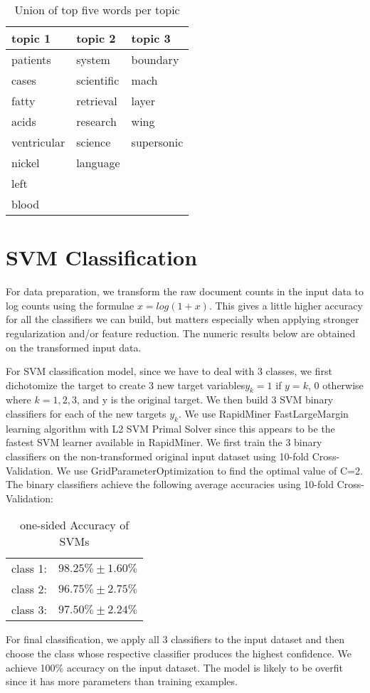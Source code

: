 \documentclass[fullpage]{article}
\begin{document}
\begin{table}[h]
\begin{center}
\begin{tabular}{| l | l | l |}
topic 1 & topic 2 & topic 3 \\
\hline
patients &system & boundary\\
cases &scientific &mach \\
fatty &retrieval &layer \\
acids &research & wing\\
ventricular &science &supersonic \\
nickel &language & \\
left & & \\
blood & & \\
\end{tabular}
\caption{Union of top five words per topic}
\end{center}
\end{table}


\section{SVM Classification}
For data preparation, we transform the raw document counts in the input data to log counts using the formulae $x=log(1+x)$. This gives a little higher accuracy for all the classifiers we can build, but matters especially when applying stronger regularization and/or feature reduction. The numeric results below are obtained on the transformed input data.

For SVM classification model, since we have to deal with 3 classes, we first dichotomize the target to create 3 new target variables$ y_{k}=1$ if $y=k$, 0 otherwise where $k=1,2,3$, and y is the original target. We then build 3 SVM binary classifiers for each of the new targets $y_{k}$. We use RapidMiner FastLargeMargin learning algorithm with L2 SVM Primal Solver since this appears to be the fastest SVM learner available in RapidMiner.
We first train the 3 binary classifiers on the non-transformed original input dataset using 10-fold Cross-Validation. We use GridParameterOptimization to find the optimal value of C=2. The binary classifiers achieve the following average accuracies using 10-fold Cross-Validation:
\begin{table}[h!]
\begin{center}
\begin{tabular} { l  r  }
class 1:& $98.25\%\pm 1.60\%$\\
class 2:& $96.75\%\pm 2.75\%$\\
class 3:& $97.50\%\pm 2.24\%$\\
\end{tabular}
\caption{one-sided Accuracy of SVMs}
\label{tab:SVM}
\end{center}
\end{table}
For final classification, we apply all 3 classifiers to the input dataset and then choose the class whose respective classifier produces the highest confidence. We achieve 100\% accuracy on the input dataset. The model is likely to be overfit since it has more parameters than training examples.
\end{document}

